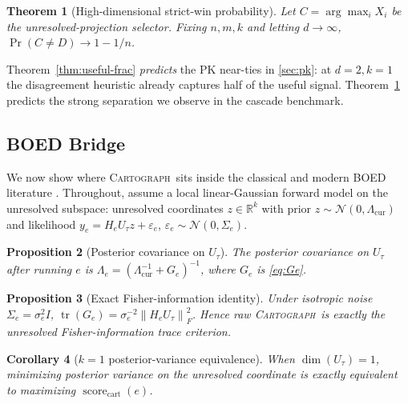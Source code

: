 \documentclass{article}
\newcommand{\method}{\textsc{Cartograph}}
\newcommand{\scorecart}{\operatorname{score}_{\mathrm{cart}}}
\newcommand{\tr}{\operatorname{tr}}
\newcommand{\real}{\mathbb{R}}
\newcommand{\norm}[1]{\left\lVert #1 \right\rVert}
\theoremstyle{plain}
\newtheorem{theorem}{Theorem}[section]
\newtheorem{proposition}[theorem]{Proposition}
\newtheorem{corollary}[theorem]{Corollary}
\theoremstyle{definition}
\theoremstyle{remark}
\begin{document}
\begin{theorem}[High-dimensional strict-win probability]
\label{thm:high-d}
Let $C=\arg\max_i X_i$ be the unresolved-projection selector. Fixing $n,m,k$
and letting $d\to\infty$, $\Pr(C\ne D)\to 1-1/n$.
\end{theorem}

Theorem~\ref{thm:useful-frac} \emph{predicts} the PK near-ties in
\cref{sec:pk}: at $d\!=\!2, k\!=\!1$ the disagreement heuristic already
captures half of the useful signal. Theorem~\ref{thm:high-d} predicts the
strong separation we observe in the cascade benchmark.

\subsection{BOED Bridge}
\label{sec:boed}

We now show where \method\ sits inside the classical and modern BOED
literature \citep{lindley1956,chaloner1995review,ryan2016review,rainforth2024modern}.
Throughout, assume a local linear-Gaussian forward model on the unresolved
subspace: unresolved coordinates $z\in\real^k$ with prior
$z\sim\mathcal{N}(0,\Lambda_{\mathrm{cur}})$ and likelihood
$y_e=H_e U_\tau z+\varepsilon_e$, $\varepsilon_e\sim\mathcal{N}(0,\Sigma_e)$.

\begin{proposition}[Posterior covariance on $U_\tau$]
\label{prop:posterior}
The posterior covariance on $U_\tau$ after running $e$ is
$\Lambda_e=(\Lambda_{\mathrm{cur}}^{-1}+G_e)^{-1}$, where $G_e$ is
\eqref{eq:Ge}.
\end{proposition}

\begin{proposition}[Exact Fisher-information identity]
\label{prop:fisher}
Under isotropic noise $\Sigma_e=\sigma_e^2 I$,
$\tr(G_e)=\sigma_e^{-2}\norm{H_e U_\tau}_F^2$. Hence raw \method\ is exactly
the unresolved Fisher-information trace criterion.
\end{proposition}

\begin{corollary}[$k\!=\!1$ posterior-variance equivalence]
\label{cor:k1}
When $\dim(U_\tau)=1$, minimizing posterior variance on the unresolved
coordinate is exactly equivalent to maximizing $\scorecart(e)$.
\end{corollary}
\end{document}
